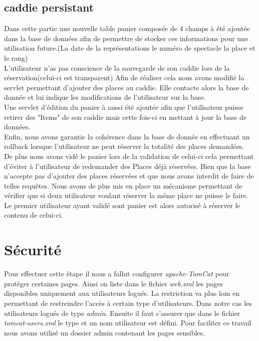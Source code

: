 ﻿\documentclass[12pt]{article}
\begin{document}
\subsection{caddie persistant}
Dans cette partie une nouvelle table panier composée  de 4 champs à été ajoutée dans la base de données afin de permettre de stocker ces informations 
pour une utilisation future.(La date de la représentations le numéro de spectacle la place et le rang)\\
L'utilisateur n'as pas conscience de la sauvegarde de son caddie lors de la réservation(celui-ci est transparent) Afin de réaliser cela nous avons modifié la servlet permettant d'ajouter des places au caddie. Elle contacte alors la base de donnée et lui indique les modifications de l'utilisateur sur la base.\\
Une servlet d'édition du panier à aussi été ajoutée afin que l'utilisateur puisse retirer des "Items" de son caddie mais cette fois-ci en mettant à jour la base de données.\\
Enfin, nous avons garantie la cohérence dans la base de donnée en effectuant un rollback lorsque l'utilisateur ne peut réserver la totalité des places demandées.
\\
De plus nous avons vidé le panier lors de la validation de celui-ci cela permettant d’éviter à l'utilisateur de redemander des Places déjà réservées. Bien que la base n'accepte pas d'ajouter des places réservées et que nous avons interdit de faire de telles requêtes.
Nous avons de plus mis en place un mécanisme permettant de vérifier que si deux utilisateur voulant réserver la même place ne puisse le faire. Le premier utilisateur ayant validé sont panier est alors autorisé à  réserver le contenu de celui-ci.


\section{Sécurité}

Pour effectuer cette étape il nous a fallut configurer \emph{apache-TomCat} pour protéger certaines pages. Ainsi on liste dans le fichier \emph{web.xml} les pages disponibles uniquement aux utilisateurs logués. La restriction va plus loin en permettant de restreindre l'accès à certain type d'utilisateurs. Dans notre cas les utilisateurs logués de type \emph{admin}. Ensuite il faut s'assurer que dans le fichier \emph{tomcat-users.xml} le type et un nom utilisateur est défini. Pour faciliter ce travail nous avons utilisé un dossier admin contenant les pages sensibles.
\end{document}
